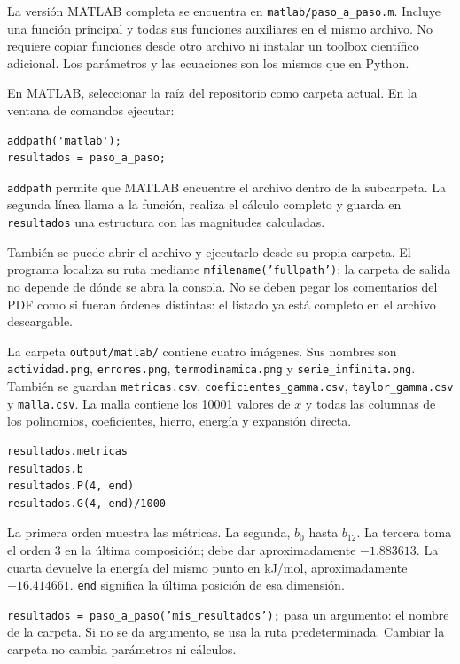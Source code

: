 La versión MATLAB completa se encuentra en \texttt{matlab/paso\_a\_paso.m}. Incluye una función principal y todas sus funciones auxiliares en el mismo archivo. No requiere copiar funciones desde otro archivo ni instalar un toolbox científico adicional. Los parámetros y las ecuaciones son los mismos que en Python.

En MATLAB, seleccionar la raíz del repositorio como carpeta actual. En la ventana de comandos ejecutar:
\begin{verbatim}
addpath('matlab');
resultados = paso_a_paso;
\end{verbatim}
\texttt{addpath} permite que MATLAB encuentre el archivo dentro de la subcarpeta. La segunda línea llama a la función, realiza el cálculo completo y guarda en \texttt{resultados} una estructura con las magnitudes calculadas.

También se puede abrir el archivo y ejecutarlo desde su propia carpeta. El programa localiza su ruta mediante \texttt{mfilename('fullpath')}; la carpeta de salida no depende de dónde se abra la consola. No se deben pegar los comentarios del PDF como si fueran órdenes distintas: el listado ya está completo en el archivo descargable.

La carpeta \texttt{output/matlab/} contiene cuatro imágenes. Sus nombres son \texttt{actividad.png}, \texttt{errores.png}, \texttt{termodinamica.png} y \texttt{serie\_infinita.png}. También se guardan \texttt{metricas.csv}, \texttt{coeficientes\_gamma.csv}, \texttt{taylor\_gamma.csv} y \texttt{malla.csv}. La malla contiene los 10001 valores de $x$ y todas las columnas de los polinomios, coeficientes, hierro, energía y expansión directa.

\begin{verbatim}
resultados.metricas
resultados.b
resultados.P(4, end)
resultados.G(4, end)/1000
\end{verbatim}
La primera orden muestra las métricas. La segunda, $b_0$ hasta $b_{12}$. La tercera toma el orden 3 en la última composición; debe dar aproximadamente $-1.883613$. La cuarta devuelve la energía del mismo punto en kJ/mol, aproximadamente $-16.414661$. \texttt{end} significa la última posición de esa dimensión.

\texttt{resultados = paso\_a\_paso('mis\_resultados');} pasa un argumento: el nombre de la carpeta. Si no se da argumento, se usa la ruta predeterminada. Cambiar la carpeta no cambia parámetros ni cálculos.

